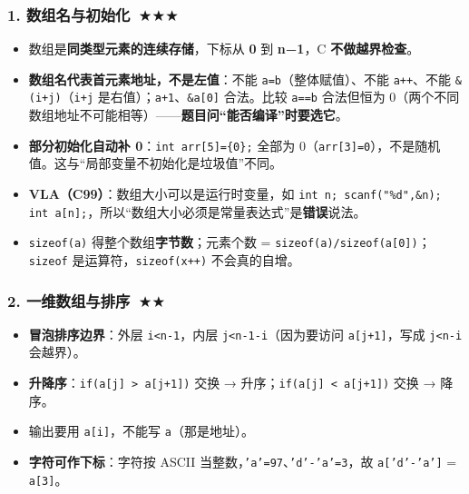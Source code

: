 \documentclass[UTF8,zihao=-4,a4paper]{ctexart}
\newcommand{\cstar}{\textcolor{deepred}{$\bigstar$}}
\begin{document}
\subsubsection*{1. 数组名与初始化\ \cstar\cstar\cstar}
\begin{itemize}
  \item 数组是\textbf{同类型元素的连续存储}，下标从 \textbf{0} 到 \textbf{n−1}，C \textbf{不做越界检查}。
  \item \textbf{数组名代表首元素地址，不是左值}：不能 \texttt{a=b}（整体赋值）、不能 \texttt{a++}、不能 \texttt{\&(i+j)}（\texttt{i+j} 是右值）；\texttt{a+1}、\texttt{\&a[0]} 合法。比较 \texttt{a==b} 合法但恒为 0（两个不同数组地址不可能相等）——\textbf{题目问“能否编译”时要选它}。
  \item \textbf{部分初始化自动补 0}：\texttt{int arr[5]=\{0\};} 全部为 0（\texttt{arr[3]=0}），不是随机值。这与“局部变量不初始化是垃圾值”不同。
  \item \textbf{VLA（C99）}：数组大小可以是运行时变量，如 \texttt{int n; scanf("\%d",\&n); int a[n];}，所以“数组大小必须是常量表达式”是\textbf{错误}说法。
  \item \texttt{sizeof(a)} 得整个数组\textbf{字节数}；元素个数 = \texttt{sizeof(a)/sizeof(a[0])}；\texttt{sizeof} 是运算符，\texttt{sizeof(x++)} 不会真的自增。
\end{itemize}

\subsubsection*{2. 一维数组与排序\ \cstar\cstar}
\begin{itemize}
  \item \textbf{冒泡排序边界}：外层 \texttt{i<n-1}，内层 \texttt{j<n-1-i}（因为要访问 \texttt{a[j+1]}，写成 \texttt{j<n-i} 会越界）。
  \item \textbf{升降序}：\texttt{if(a[j] > a[j+1])} 交换 → 升序；\texttt{if(a[j] < a[j+1])} 交换 → 降序。
  \item 输出要用 \texttt{a[i]}，不能写 \texttt{a}（那是地址）。
  \item \textbf{字符可作下标}：字符按 ASCII 当整数，\texttt{'a'=97}、\texttt{'d'-'a'=3}，故 \texttt{a['d'-'a']} = \texttt{a[3]}。
\end{itemize}
\end{document}

